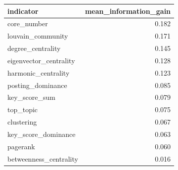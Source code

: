 \begin{tabular}{lr}
\toprule
indicator & mean\_information\_gain \\
\midrule
core\_number & 0.182 \\
louvain\_community & 0.171 \\
degree\_centrality & 0.145 \\
eigenvector\_centrality & 0.128 \\
harmonic\_centrality & 0.123 \\
posting\_dominance & 0.085 \\
key\_score\_sum & 0.079 \\
top\_topic & 0.075 \\
clustering & 0.067 \\
key\_score\_dominance & 0.063 \\
pagerank & 0.060 \\
betweenness\_centrality & 0.016 \\
\bottomrule
\end{tabular}
